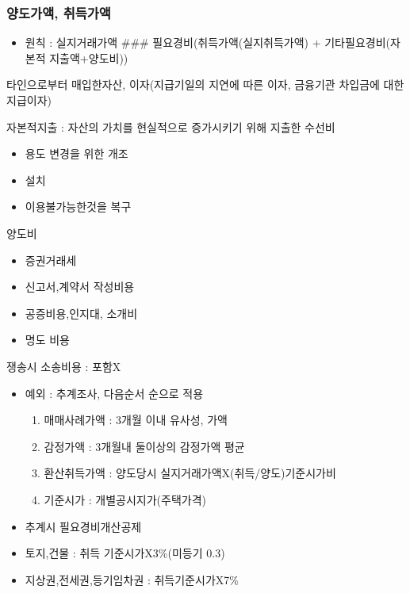 \documentclass{oblivoir}
\begin{document}
\begin{multicols}{2}

\subsubsection{양도가액,
취득가액}\label{uxc591uxb3c4uxac00uxc561-uxcde8uxb4dduxac00uxc561}

\begin{itemize}
\itemsep1pt\parskip0pt
\item
  원칙 : 실지거래가액 \#\#\# 필요경비(취득가액(실지취득가액) +
  기타필요경비(자본적 지출액+양도비))
\end{itemize}

타인으로부터 매입한자산, 이자(지급기일의 지연에 따른 이자, 금융기관
차입금에 대한 지급이자)

자본적지출 : 자산의 가치를 현실적으로 증가시키기 위해 지출한 수선비

\begin{itemize}
\itemsep1pt\parskip0pt
\item
  용도 변경을 위한 개조
\item
  설치
\item
  이용불가능한것을 복구
\end{itemize}

양도비

\begin{itemize}
\itemsep1pt\parskip0pt
\item
  증권거래세
\item
  신고서,계약서 작성비용
\item
  공증비용,인지대, 소개비
\item
  명도 비용
\end{itemize}

쟁송시 소송비용 : 포함X

\begin{itemize}
\itemsep1pt\parskip0pt
\item
  예외 : 추계조사, 다음순서 순으로 적용

  \begin{enumerate}
  \def\labelenumi{\arabic{enumi}.}
  \itemsep1pt\parskip0pt
  \item
    매매사례가액 : 3개월 이내 유사성, 가액
  \item
    감정가액 : 3개월내 둘이상의 감정가액 평균
  \item
    환산취득가액 : 양도당시 실지거래가액X(취득/양도)기준시가비
  \item
    기준시가 : 개별공시지가(주택가격)
  \end{enumerate}
\item
  추계시 필요경비개산공제
\item
  토지,건물 : 취득 기준시가X3\%(미등기 0.3)
\item
  지상권,전세권,등기임차권 : 취득기준시가X7\%
\end{itemize}


\end{multicols}
\end{document}
